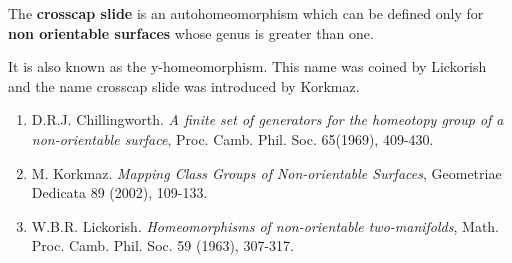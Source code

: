 \documentclass[12pt]{article}
\begin{document}
The {\bf crosscap slide} is an autohomeomorphism which can be defined only for 
{\bf non orientable surfaces} whose genus is greater than one. 

It is also known as the  y-homeomorphism. This name was coined by Lickorish and the name crosscap slide was introduced by Korkmaz.

\begin{enumerate}
\item D.R.J. Chillingworth. {\it A finite set of generators for the 
ho\-meo\-to\-py group of a non-orientable surface}, Proc. Camb. Phil. Soc. 
65(1969), 409-430.
\item M. Korkmaz. {\it Mapping Class Groups of Non-orientable Surfaces}, Geometriae Dedicata 89 (2002), 109-133.
\item W.B.R. Lickorish. {\it Homeomorphisms of non-orientable two-manifolds}, 
Math. Proc. Camb. Phil. Soc. 59 (1963), 307-317.
\end{enumerate}
\end{document}
